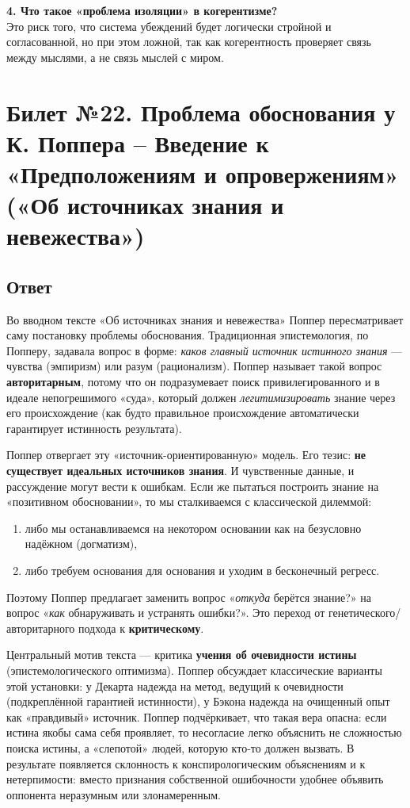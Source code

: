 \documentclass[a4paper,12pt]{article}
\begin{document}
\textbf{4. Что такое «проблема изоляции» в когерентизме?}\\
Это риск того, что система убеждений будет логически стройной и согласованной, но при этом ложной, так как когерентность проверяет связь между мыслями, а не связь мыслей с миром.



\newpage
\section{Билет №22. Проблема обоснования у К. Поппера – Введение к «Предположениям и опровержениям» («Об источниках знания и невежества»)}

\subsection{Ответ}

Во вводном тексте «Об источниках знания и невежества» Поппер пересматривает саму постановку проблемы обоснования. Традиционная эпистемология, по Попперу, задавала вопрос в форме: \emph{каков главный источник истинного знания} — чувства (эмпиризм) или разум (рационализм). Поппер называет такой вопрос \textbf{авторитарным}, потому что он подразумевает поиск привилегированного и в идеале непогрешимого «суда», который должен \emph{легитимизировать} знание через его происхождение (как будто правильное происхождение автоматически гарантирует истинность результата).

Поппер отвергает эту «источник-ориентированную» модель. Его тезис: \textbf{не существует идеальных источников знания}. И чувственные данные, и рассуждение могут вести к ошибкам. Если же пытаться построить знание на «позитивном обосновании», то мы сталкиваемся с классической дилеммой:
\begin{enumerate}
    \item либо мы останавливаемся на некотором основании как на безусловно надёжном (догматизм),
    \item либо требуем основания для основания и уходим в бесконечный регресс.
\end{enumerate}
Поэтому Поппер предлагает заменить вопрос «\emph{откуда} берётся знание?» на вопрос «\emph{как} обнаруживать и устранять ошибки?». Это переход от генетического/авторитарного подхода к \textbf{критическому}.

Центральный мотив текста --- критика \textbf{учения об очевидности истины} (эпистемологического оптимизма). Поппер обсуждает классические варианты этой установки: у Декарта надежда на метод, ведущий к очевидности (подкреплённой гарантией истинности), у Бэкона надежда на очищенный опыт как «правдивый» источник. Поппер подчёркивает, что такая вера опасна: если истина якобы сама себя проявляет, то несогласие легко объяснить не сложностью поиска истины, а «слепотой» людей, которую кто-то должен вызвать. В результате появляется склонность к конспирологическим объяснениям и к нетерпимости: вместо признания собственной ошибочности удобнее объявить оппонента неразумным или злонамеренным.
\end{document}
